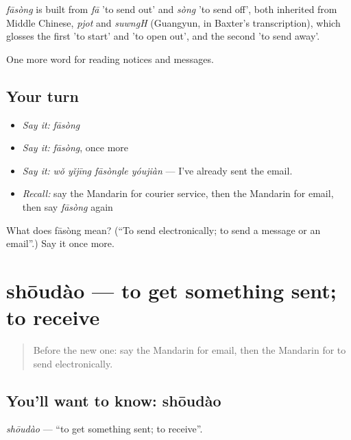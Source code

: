 \begin{cousinweb}
\emph{fāsòng} is built from \emph{fā} 'to send out' and \emph{sòng} 'to send off', both inherited from Middle Chinese, \emph{pjot} and \emph{suwngH} (Guangyun, in Baxter's transcription), which glosses the first 'to start' and 'to open out', and the second 'to send away'.
\end{cousinweb}

\begin{grammarlens}[title={What you've built}]
One more word for reading notices and messages.
\end{grammarlens}

\subsection*{Your turn}
\begin{itemize}
\raggedright
  \item \emph{Say it:} \emph{fāsòng}
  \item \emph{Say it:} \emph{fāsòng}, once more
  \item \emph{Say it:} \emph{wǒ yǐjīng fāsòngle yóujiàn} — I've already sent the email.
  \item \emph{Recall:} say the Mandarin for courier service, then the Mandarin for email, then say \emph{fāsòng} again
\end{itemize}

\begin{tcolorbox}[breakable,colback=teal!4,colframe=teal!35!black,title={Before you move on}]
What does fāsòng mean? (\textquotedblleft{}To send electronically; to send a message or an email\textquotedblright{}.) Say it once more.
\end{tcolorbox}
\section[shōudào]{shōudào — to get something sent; to receive}

\label{lesson:ZH-C201-shoudao}



\begin{quote}
Before the new one: say the Mandarin for email, then the Mandarin for to send electronically.
\end{quote}

\subsection*{You'll want to know: shōudào}
\emph{shōudào} — \textquotedblleft{}to get something sent; to receive\textquotedblright{}.

